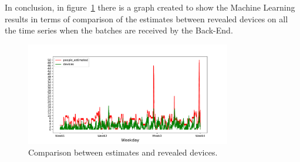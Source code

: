 
In conclusion, in figure~\ref{fig:devicespredictions} there is a graph created to show the Machine Learning results in terms of comparison of the estimates between revealed devices on all the time series when the batches are received by the Back-End.

\begin{figure}[h]
\centering 
\includegraphics[width=0.8\textwidth]{images/devicespredictions} 
\caption{Comparison between estimates and revealed devices.}
\label{fig:devicespredictions}
\end{figure}

